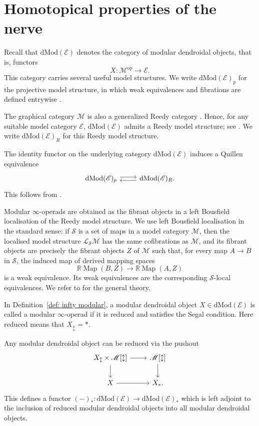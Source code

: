 \documentclass{amsart}
\newcommand{\bE}{\mathscr{E}}
\newcommand{\bM}{\mathscr{M}}
\newcommand{\dMod}{\mathrm{dMod}}
\newcommand{\Map}{\operatorname{Map}}
\theoremstyle{definition}
\numberwithin{equation}{section}
\begin{document}
\section{Homotopical properties of the nerve}\label{sec: nerve is homotopically fully faithful}

Recall that $\dMod(\bE)$ denotes the category of modular dendroidal objects, that is, functors
\[
X:\bM^{\mathrm{op}}\longrightarrow \bE .
\]
This category carries several useful model structures. We write $\dMod(\bE)_p$ for the projective model structure, in which weak equivalences and fibrations are defined entrywise \cite[Theorem 11.6.1]{hirsch}.

The graphical category $\bM$ is also a generalized Reedy category \cite[Theorem~2.22]{hry1}. Hence, for any suitable model category $\bE$, $\dMod(\bE)$ admits a Reedy model structure; see \cite[Theorem~1.6]{bm_reedy}. We write $\dMod(\bE)_R$ for this Reedy model structure.

The identity functor on the underlying category $\dMod(\bE)$ induces a Quillen equivalence
\begin{equation}\label{identity qe}
\begin{tikzcd}
\dMod(\bE)_p \arrow[r, shift left=1] &
\dMod(\bE)_R \arrow[l, shift left=1].
\end{tikzcd}
\end{equation}
This follows from \cite[Lemma 3.9]{hry1}.

Modular $\infty$-operads are obtained as the fibrant objects in a left Bousfield localisation of the Reedy model structure. We use left Bousfield localisation in the standard sense: if $\mathcal{S}$ is a set of maps in a model category $\mathcal{M}$, then the localised model structure $\mathcal{L}_{\mathcal{S}}\mathcal{M}$ has the same cofibrations as $\mathcal{M}$, and its fibrant objects are precisely the fibrant objects $Z$ of $\mathcal{M}$ such that, for every map $A\to B$ in $\mathcal{S}$, the induced map of derived mapping spaces
\[
\mathbb{R}\Map(B,Z)\longrightarrow \mathbb{R}\Map(A,Z)
\]
is a weak equivalence. Its weak equivalences are the corresponding $\mathcal{S}$-local equivalences. We refer to \cite[Chapters~3--4]{hirsch} for the general theory.

In Definition~\ref{def: infty modular}, a modular dendroidal object $X\in\dMod(\bE)$ is called a modular $\infty$-operad if it is reduced and
satisfies the Segal condition. Here reduced means that $X_{\updownarrow}=*$.

Any modular dendroidal object can be reduced via the pushout
\[
\begin{tikzcd}
X_{\updownarrow}\times \bM[\updownarrow]\arrow[d]\arrow[r] &
\bM[\updownarrow]\arrow[d]\\
X\arrow[r] & X_* .
\end{tikzcd}
\]
This defines a functor $(-)_*:\dMod(\bE)\longrightarrow \dMod(\bE)_*$ which is left adjoint to the inclusion of reduced modular dendroidal objects into all
modular dendroidal objects.
\end{document}
